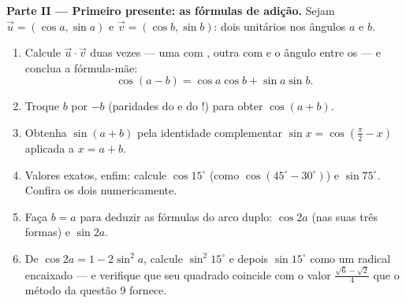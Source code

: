 \begin{problem}
\medskip
\noindent\textbf{Parte II --- Primeiro presente: as fórmulas de
adição.}
Sejam $\vec u = (\cos a, \sin a)$ e $\vec v = (\cos b, \sin b)$:
dois  unitários nos ângulos $a$ e $b$.
\begin{enumerate}[resume]
  \item Calcule $\vec u \cdot \vec v$ duas vezes --- uma com
        , outra com  e o ângulo entre os 
        --- e conclua a fórmula-mãe:
        \[
        \cos(a - b) = \cos a \cos b + \sin a \sin b .
        \]
  \item Troque $b$ por $-b$ (paridades do  e do !)
        para obter $\cos(a + b)$.
  \item Obtenha $\sin(a + b)$ pela identidade complementar
        $\sin x = \cos\left(\frac\pi2 - x\right)$ aplicada a
        $x = a + b$.
  \item Valores exatos, enfim: calcule $\cos 15^\circ$ (como
        $\cos(45^\circ - 30^\circ)$) e $\sin 75^\circ$. Confira
        os dois numericamente.
  \item Faça $b = a$ para deduzir as fórmulas do arco duplo:
        $\cos 2a$ (nas suas três formas) e $\sin 2a$.
  \item De $\cos 2a = 1 - 2\sin^2 a$, calcule $\sin^2 15^\circ$
        e depois $\sin 15^\circ$ como um radical encaixado --- e
        verifique que seu quadrado coincide com o valor
        $\frac{\sqrt6 - \sqrt2}{4}$ que o método da questão 9
        fornece.
\end{enumerate}


\end{problem}
